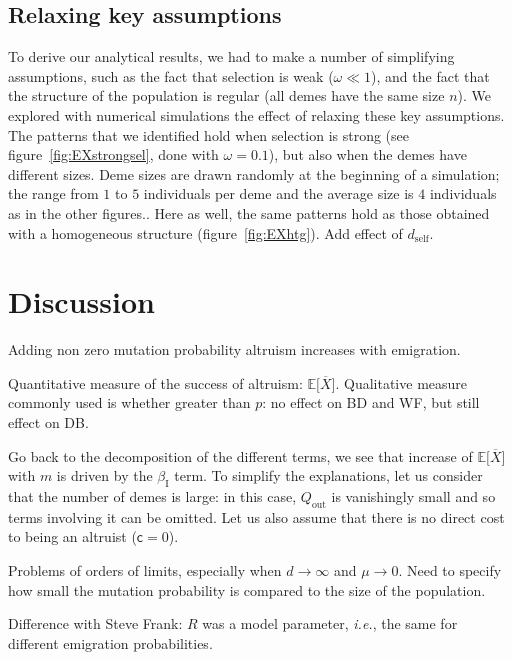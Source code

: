\documentclass[11pt, letterpaper]{article}
\newcommand{\ie}{\textit{i.\!e.\!}}
\newcommand{\Esp}[1]{\mathbb{E}\big[ #1\big]}%
\newcommand{\cc}{\mathsf{c}}
\newcommand{\indirect}{\mathrm{I}}
\newcommand{\dself}{d_{\textrm{self}}}
\newcommand{\Qout}{Q_{\textrm{out}}}
\begin{document}
\subsection{Relaxing key assumptions}

To derive our analytical results, we had to make a number of simplifying assumptions, such as the fact that selection is weak ($\omega \ll 1$), and the fact that the structure of the population is regular (all demes have the same size $n$). We explored with numerical simulations the effect of relaxing these key assumptions. The patterns that we identified hold when selection is strong (see figure~\ref{fig:EXstrongsel}, done with $\omega = 0.1$), but also when the demes have different sizes. Deme sizes are drawn randomly at the beginning of a simulation; the range from $1$ to $5$ individuals per deme and the average size is $4$ individuals as in the other figures.. Here as well, the same patterns hold as those obtained with a homogeneous structure (figure~\ref{fig:EXhtg}). Add effect of $\dself$.

\section{Discussion}

Adding non zero mutation probability altruism increases with emigration. 

Quantitative measure of the success of altruism: $\Esp{\overline{X}}$. Qualitative measure commonly used is whether greater than $p$: no effect on BD and WF, but still effect on DB. 

Go back to the decomposition of the different terms, we see that increase of $\Esp{\overline{X}}$ with $m$ is driven by the $\beta_{\indirect}$ term. To simplify the explanations, let us consider that the number of demes is large: in this case, $\Qout$ is vanishingly small and so terms involving it can be omitted. Let us also assume that there is no direct cost to being an altruist ($\cc = 0$). 

Problems of orders of limits, especially when $d \to \infty$ and $\mu \to 0$. Need to specify how small the mutation probability is compared to the size of the population. 

Difference with Steve Frank: $R$ was a model parameter, \ie, the same for different emigration probabilities. 
\end{document}
